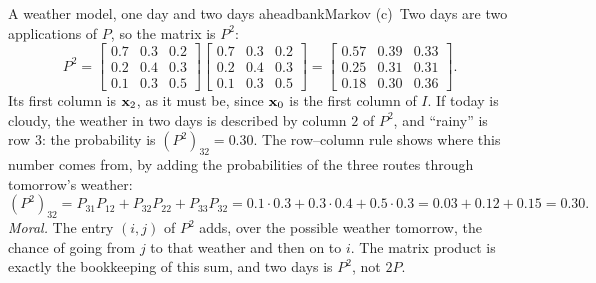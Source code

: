 \documentclass[11pt]{article}
\begin{document}
\begin{exmp}{A weather model, one day and two days ahead}{bankMarkov}
(c)~Two days are two applications of $P$, so the matrix is $P^2$:
\[
P^2=\begin{bmatrix}0.7&0.3&0.2\\0.2&0.4&0.3\\0.1&0.3&0.5\end{bmatrix}\begin{bmatrix}0.7&0.3&0.2\\0.2&0.4&0.3\\0.1&0.3&0.5\end{bmatrix}=\begin{bmatrix}0.57&0.39&0.33\\0.25&0.31&0.31\\0.18&0.30&0.36\end{bmatrix}.
\]
Its first column is $\mathbf{x}_2$, as it must be, since $\mathbf{x}_0$ is the first column of $I$. If today is cloudy, the weather in two days is described by column $2$ of $P^2$, and ``rainy'' is row $3$: the probability is $(P^2)_{32}=0.30$. The row--column rule shows where this number comes from, by adding the probabilities of the three routes through tomorrow's weather:
\[
(P^2)_{32}=P_{31}P_{12}+P_{32}P_{22}+P_{33}P_{32}=0.1\cdot0.3+0.3\cdot0.4+0.5\cdot0.3=0.03+0.12+0.15=0.30 .
\]
\emph{Moral.} The entry $(i,j)$ of $P^2$ adds, over the possible weather tomorrow, the chance of going from $j$ to that weather and then on to $i$. The matrix product is exactly the bookkeeping of this sum, and two days is $P^2$, not $2P$.
\end{exmp}
\end{document}
